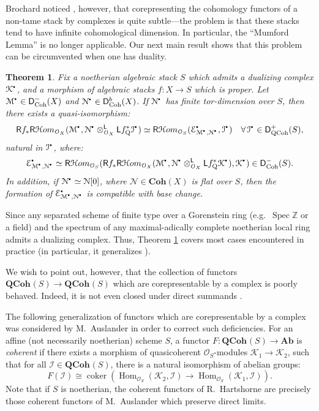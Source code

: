 \documentclass{amsart}
\theoremstyle{plain}
\newtheorem{mainthm}{Theorem}
\theoremstyle{definition}
\theoremstyle{remark}
\numberwithin{equation}{section}
\newcommand{\Z}{\mathbb{Z}}
\newcommand{\Orb}{\mathcal{O}}
\DeclareMathOperator{\spec}{Spec}
\newcommand{\COH}[1]{\mathbf{Coh}({#1})}
\newcommand{\QCOHB}{\mathbf{QCoh}}
\newcommand{\QCOH}[2][]{\QCOHB^{#1}({#2})}
\DeclareMathOperator{\coker}{coker}
\DeclareMathOperator{\Hom}{Hom}
\newcommand{\RDERF}{\mathsf{R}}
\newcommand{\LDERF}{\mathsf{L}}
\newcommand{\DCAT}{\mathsf{D}}
\newcommand{\SHom}{\mathcal{H}om}
\newcommand{\SRHom}{\RDERF\SHom}
\newcommand{\tensor}{\otimes}
\newcommand{\homotopic}{\simeq}
\newcommand{\AB}{\mathbf{Ab}}
\newcommand{\shv}[1]{\mathcal{{#1}}}
\newcommand{\fndefn}[1]{\emph{{#1}}}
\newcommand{\QCPSH}[1]{{#1}_{*}}
\newcommand{\QCPBK}[1]{{#1}_{\mathrm{Q}}^*}
\newcommand{\DQCOH}{\DCAT_{\mathrm{QCoh}}}
\newcommand{\DCOH}{\DCAT_{\mathrm{Coh}}}
\newcommand{\sbt}{\,\begin{picture}(-1,-1)(0,-2)\circle*{1.5}\end{picture}\ }
\newcommand{\cplx}[1]{\shv{{#1}}^{\sbt}}
\begin{document}
Brochard noticed \cite[App.~A]{MR2871149}, however,
that corepresenting the cohomology functors of a non-tame stack by
complexes is quite subtle---the problem is that these stacks tend to
have infinite cohomological dimension. In particular, the ``Mumford Lemma''
\cite[Lem.~5.1]{MR0282985} is no longer applicable. Our next main
result shows that this problem can be circumvented when one has duality.
\begin{mainthm}\label{mainthms:coh_stk_dual}
  Fix a noetherian algebraic stack $S$ which admits a dualizing
  complex $\cplx{K}$, and a morphism of algebraic stacks $f : X
  \to S$ which is proper. Let $\cplx{M} \in  
  \DCOH^-(X)$ and $\cplx{N} \in
  \DCOH^b(X)$. If $\cplx{N}$ has finite tor-dimension over $S$, 
  then there exists a quasi-isomorphism:
  \begin{equation*}
    \RDERF \QCPSH{f}\SRHom_{\Orb_X}(\cplx{M},\cplx{N}
    \tensor_{\Orb_X}^{\LDERF } \LDERF \QCPBK{f}\cplx{I}) \homotopic
    \SRHom_{\Orb_S}(\cplx{E}_{\cplx{M},\cplx{N}},\cplx{I}) \quad
    \forall\, \cplx{I} \in
    \DQCOH^+(S),
  \end{equation*}  
  natural in $\cplx{I}$, where:
  \[
  \cplx{E}_{\cplx{M},\cplx{N}} \homotopic
  \SRHom_{\Orb_S}(\RDERF \QCPSH{f}\SRHom_{\Orb_X}(\cplx{M},\cplx{N}
  \tensor_{\Orb_X}^{\LDERF } \LDERF
  \QCPBK{f}\cplx{K}),\cplx{K}) \in \DCOH^-(S). 
  \]
  In addition, if $\cplx{N} \homotopic \shv{N}[0]$, where $\shv{N} \in
  \COH{X}$ is flat over $S$, then the formation of
  $\cplx{E}_{\cplx{M},\cplx{N}}$ is compatible with base change. 
\end{mainthm}
Since any separated scheme of finite type over a Gorenstein ring
(e.g.~$\spec \Z$ or a field) and the spectrum of any maximal-adically
complete noetherian local ring admits a dualizing complex. Thus, Theorem
\ref{mainthms:coh_stk_dual} covers most cases encountered in practice
(in particular, it generalizes \cite[Lem.~6.1]{MR1437495}). 

We wish to point out, however, that the collection of functors
$\QCOH{S} \to \QCOH{S}$ which are 
corepresentable by a complex is poorly behaved. Indeed, it is 
not even closed under direct summands \cite[Prop.~4.6 \& Ex.~5.5]{MR1656482}.

The following generalization of functors which are corepresentable by
a complex was considered by M.~Auslander \cite{MR0212070} in order to 
correct such deficiencies. For an
affine (not necessarily noetherian) scheme $S$, a functor $F :
\QCOH{S} \to \AB$ is \fndefn{coherent} if there exists a morphism of
quasicoherent $\Orb_S$-modules $\shv{K}_1 \to \shv{K}_2$, such that
for all $\shv{I}\in \QCOH{S}$, there is a natural isomorphism of
abelian groups:
\[
F(\shv{I}) \cong \coker(\Hom_{\Orb_S}(\shv{K}_2,\shv{I}) \to
\Hom_{\Orb_S}(\shv{K}_1,\shv{I})). 
\]
Note that if $S$ is noetherian, the coherent functors of R.~Hartshorne
\cite{MR1656482} are precisely those coherent functors of M.~Auslander
\cite{MR0212070} which preserve direct limits. 
\end{document}
